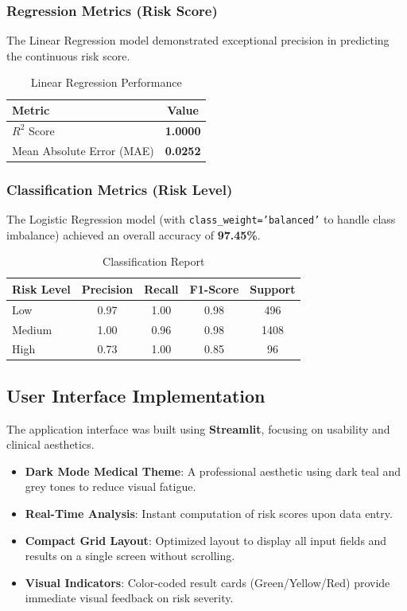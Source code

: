 \documentclass[12pt, a4paper]{article}
\begin{document}
\subsubsection{Regression Metrics (Risk Score)}
The Linear Regression model demonstrated exceptional precision in predicting the continuous risk score.

\begin{table}[H]
\centering
\begin{tabular}{lc}
\toprule
\textbf{Metric} & \textbf{Value} \\
\midrule
$R^2$ Score & \textbf{1.0000} \\
Mean Absolute Error (MAE) & \textbf{0.0252} \\
\bottomrule
\end{tabular}
\caption{Linear Regression Performance}
\end{table}

\subsubsection{Classification Metrics (Risk Level)}
The Logistic Regression model (with \texttt{class\_weight='balanced'} to handle class imbalance) achieved an overall accuracy of \textbf{97.45\%}.

\begin{table}[H]
\centering
\begin{tabular}{lcccc}
\toprule
\textbf{Risk Level} & \textbf{Precision} & \textbf{Recall} & \textbf{F1-Score} & \textbf{Support} \\
\midrule
Low & 0.97 & 1.00 & 0.98 & 496 \\
Medium & 1.00 & 0.96 & 0.98 & 1408 \\
High & 0.73 & 1.00 & 0.85 & 96 \\
\bottomrule
\end{tabular}
\caption{Classification Report}
\end{table}

\subsection{User Interface Implementation}
The application interface was built using \textbf{Streamlit}, focusing on usability and clinical aesthetics.
\begin{itemize}
    \item \textbf{Dark Mode Medical Theme}: A professional aesthetic using dark teal and grey tones to reduce visual fatigue.
    \item \textbf{Real-Time Analysis}: Instant computation of risk scores upon data entry.
    \item \textbf{Compact Grid Layout}: Optimized layout to display all input fields and results on a single screen without scrolling.
    \item \textbf{Visual Indicators}: Color-coded result cards (Green/Yellow/Red) provide immediate visual feedback on risk severity.
\end{itemize}
\end{document}
